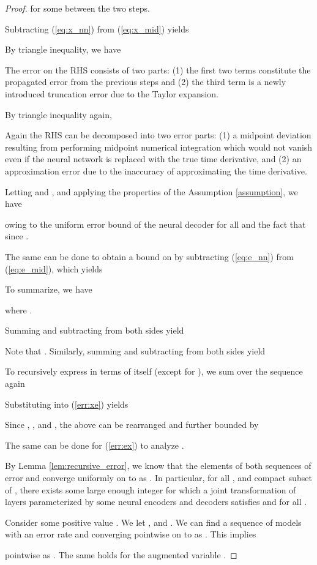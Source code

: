 \documentclass{article}
\begin{document}
\begin{proof}
for some  between the two steps. 

Subtracting (\ref{eq:x_nn}) from (\ref{eq:x_mid}) yields


By triangle inequality, we have


The error on the RHS consists of two parts: (1) the first two terms constitute the propagated error from the previous steps and (2) the third term is a newly introduced truncation error due to the Taylor expansion. 

By triangle inequality again,

\resizebox{1.00\linewidth}{!}{
\begin{minipage}{\linewidth}

\end{minipage}
}

Again the RHS can be decomposed into two error parts: (1) a midpoint deviation resulting from performing midpoint numerical integration which would not vanish even if the neural network is replaced with the true time derivative, and (2) an approximation error due to the inaccuracy of approximating the time derivative. 

Letting  and , and applying the properties of the Assumption \ref{assumption}, we have

owing to the uniform error bound of the neural decoder
 for all  and the fact that  since .  

The same can be done to obtain a bound on  by subtracting (\ref{eq:e_nn}) from (\ref{eq:e_mid}), which yields


To summarize, we have

where .


Summing  and subtracting  from both sides yield

Note that . 
Similarly, summing  and subtracting  from both sides yield


To recursively express  in terms of itself (except for ), 
we sum over the sequence  again 


Substituting into (\ref{err:xe}) yields


Since ,
,
 and , the above can be rearranged and further bounded by



The same can be done for (\ref{err:ex}) to analyze . 





By Lemma \ref{lem:recursive_error}, we know that the elements of both sequences of error  and  converge uniformly on  to  as . 
In particular, for all ,  and compact subset  of , there exists some large enough integer  for which a joint transformation of  layers parameterized by some neural encoders and decoders satisfies
 and  for all .


Consider some positive value . 
We let ,  and . 
We can find a sequence of models with an error rate  and  converging pointwise on  to  as .
This implies 

pointwise as . 
The same holds for the augmented variable . 
\end{proof}
\end{document}

